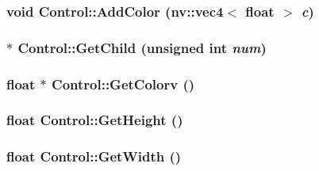 \hypertarget{class_control_1cdbb9fe5cbb9c4d8cf6c1513ae502ac}{
\subsubsection[{AddColor}]{\setlength{\rightskip}{0pt plus 5cm}void Control::AddColor ({\bf nv::vec4}$<$ float $>$ {\em c})}}
\label{class_control_1cdbb9fe5cbb9c4d8cf6c1513ae502ac}


\hypertarget{class_control_3961b1b4e64d6ea03903f2c6e3c16c5a}{
\subsubsection[{GetChild}]{ $\ast$ Control::GetChild (unsigned int {\em num})}}
\label{class_control_3961b1b4e64d6ea03903f2c6e3c16c5a}


\hypertarget{class_control_f5e0027ce1780579d4148c214ed97162}{
\subsubsection[{GetColorv}]{\setlength{\rightskip}{0pt plus 5cm}float $\ast$ Control::GetColorv ()}}
\label{class_control_f5e0027ce1780579d4148c214ed97162}


\hypertarget{class_control_623c5af26b7c0295285395cdb607caf1}{
\subsubsection[{GetHeight}]{\setlength{\rightskip}{0pt plus 5cm}float Control::GetHeight ()}}
\label{class_control_623c5af26b7c0295285395cdb607caf1}


\hypertarget{class_control_7cf1ac530fbe1807014c89576b1cee5f}{
\subsubsection[{GetWidth}]{\setlength{\rightskip}{0pt plus 5cm}float Control::GetWidth ()}}
\label{class_control_7cf1ac530fbe1807014c89576b1cee5f}



